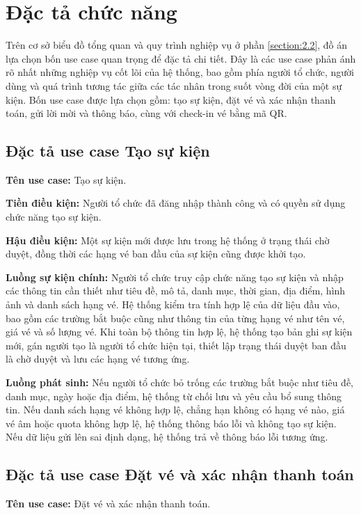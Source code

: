 \documentclass[../DoAn.tex]{subfiles}
\begin{document}
\section{Đặc tả chức năng}
\label{section:2.3}
Trên cơ sở biểu đồ tổng quan và quy trình nghiệp vụ ở phần \ref{section:2.2}, đồ án lựa chọn bốn use case quan trọng để đặc tả chi tiết. Đây là các use case phản ánh rõ nhất những nghiệp vụ cốt lõi của hệ thống, bao gồm phía người tổ chức, người dùng và quá trình tương tác giữa các tác nhân trong suốt vòng đời của một sự kiện. Bốn use case được lựa chọn gồm: tạo sự kiện, đặt vé và xác nhận thanh toán, gửi lời mời và thông báo, cùng với check-in vé bằng mã \gls{QR}.

\subsection{Đặc tả use case Tạo sự kiện}
\textbf{Tên use case:} Tạo sự kiện.

\textbf{Tiền điều kiện:} Người tổ chức đã đăng nhập thành công và có quyền sử dụng chức năng tạo sự kiện.

\textbf{Hậu điều kiện:} Một sự kiện mới được lưu trong hệ thống ở trạng thái chờ duyệt, đồng thời các hạng vé ban đầu của sự kiện cũng được khởi tạo.

\textbf{Luồng sự kiện chính:}
Người tổ chức truy cập chức năng tạo sự kiện và nhập các thông tin cần thiết như tiêu đề, mô tả, danh mục, thời gian, địa điểm, hình ảnh và danh sách hạng vé. Hệ thống kiểm tra tính hợp lệ của dữ liệu đầu vào, bao gồm các trường bắt buộc cũng như thông tin của từng hạng vé như tên vé, giá vé và số lượng vé. Khi toàn bộ thông tin hợp lệ, hệ thống tạo bản ghi sự kiện mới, gán người tạo là người tổ chức hiện tại, thiết lập trạng thái duyệt ban đầu là chờ duyệt và lưu các hạng vé tương ứng.

\textbf{Luồng phát sinh:}
Nếu người tổ chức bỏ trống các trường bắt buộc như tiêu đề, danh mục, ngày hoặc địa điểm, hệ thống từ chối lưu và yêu cầu bổ sung thông tin. Nếu danh sách hạng vé không hợp lệ, chẳng hạn không có hạng vé nào, giá vé âm hoặc quota không hợp lệ, hệ thống thông báo lỗi và không tạo sự kiện. Nếu dữ liệu gửi lên sai định dạng, hệ thống trả về thông báo lỗi tương ứng.

\subsection{Đặc tả use case Đặt vé và xác nhận thanh toán}
\textbf{Tên use case:} Đặt vé và xác nhận thanh toán.
\end{document}
